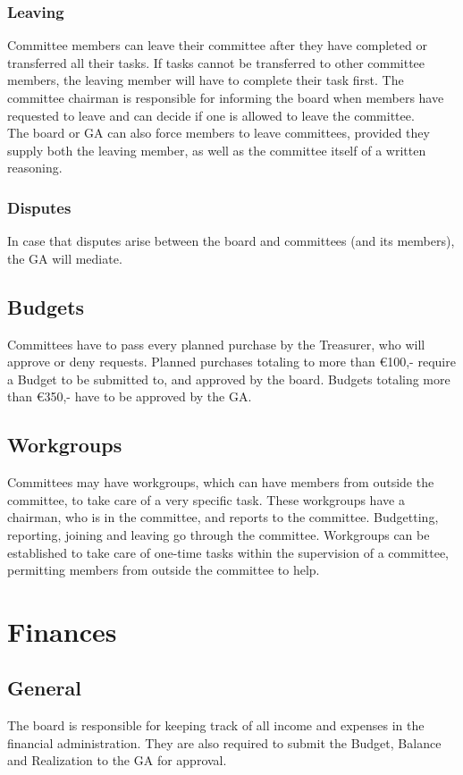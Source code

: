 \documentclass[a4paper]{article}
\begin{document}
\subsubsection{Leaving}
Committee members can leave their committee after they have completed or transferred all their tasks. If tasks cannot be transferred to other committee members, the leaving member will have to complete their task first. The committee chairman is responsible for informing the board when members have requested to leave and can decide if one is allowed to leave the committee. \\ 

The board or GA can also force members to leave committees, provided they supply both the leaving member, as well as the committee itself of a written reasoning.

\subsubsection{Disputes}
In case that disputes arise between the board and committees (and its members), the GA will mediate.

\subsection{Budgets}
Committees have to pass every planned purchase by the Treasurer, who will approve or deny requests. Planned purchases totaling to more than €100,- require a Budget to be submitted to, and approved by the board. Budgets totaling more than €350,- have to be approved by the GA.

\subsection{Workgroups}
Committees may have workgroups, which can have members from outside the committee, to take care of a very specific task. These workgroups have a chairman, who is in the committee, and reports to the committee. Budgetting, reporting, joining and leaving go through the committee. Workgroups can be established to take care of one-time tasks within the supervision of a committee, permitting members from outside the committee to help.

\section{Finances}
\subsection{General}
The board is responsible for keeping track of all income and expenses in the financial administration. They are also required to submit the Budget, Balance and Realization to the GA for approval.
\end{document}
